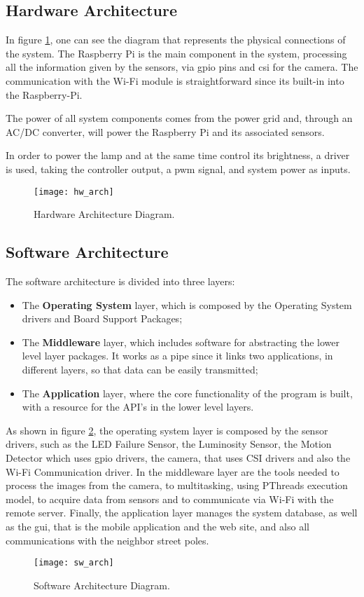 \clearpage

\subsection{Hardware Architecture}
In figure \ref{fig:hw_arch}, one can see the diagram that represents the physical connections of the system. The Raspberry Pi is the main component in the system, processing all the information given by the sensors, via \ac{gpio} pins and \ac{csi} for the camera. The communication with the Wi-Fi module is straightforward since its built-in into the Raspberry-Pi.

The power of all system components comes from the power grid and, through an AC/DC converter, will power the Raspberry Pi and its associated sensors.

In order to power the lamp and at the same time control its brightness, a driver is used, taking the controller output, a \ac{pwm} signal, and system power as inputs. 

\begin{figure}[ht]
	\centering
	\texttt{[image: hw\_arch]}
	\caption{Hardware Architecture Diagram.}
	\label{fig:hw_arch}
\end{figure}

\subsection{Software Architecture}
The software architecture is divided into three layers:

\begin{itemize}
	\item The \textbf{Operating System} layer, which is composed by the Operating System drivers and Board Support Packages;
	\item The \textbf{Middleware} layer, which includes software for abstracting the lower level layer packages. It works as a pipe since it links two applications, in different layers, so that data can be easily transmitted;
	\item The \textbf{Application} layer, where the core functionality of the program is built, with a resource for the API's in the lower level layers.
\end{itemize}

As shown in figure \ref{fig:sw_arch}, the operating system layer is composed by the sensor drivers, such as the LED Failure Sensor, the Luminosity Sensor, the Motion Detector which uses \ac{gpio} drivers, the camera, that uses CSI drivers and also the Wi-Fi Communication driver. In the middleware layer are the tools needed to process the images from the camera, to multitasking, using PThreads execution model, to acquire data from sensors and to communicate via Wi-Fi with the remote server. Finally, the application layer manages the system database, as well as the \ac{gui}, that is the mobile application and the web site, and also all communications with the neighbor street poles.

\begin{figure}[ht]
	\centering
	\texttt{[image: sw\_arch]}
	\caption{Software Architecture Diagram.}
	\label{fig:sw_arch}
\end{figure}